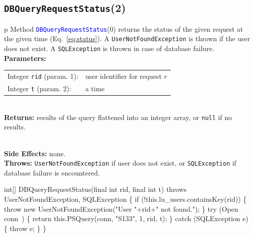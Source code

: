 \subsection{\texttt{DBQueryRequestStatus}(2)}
\begin{tabular}{p{\textwidth}}
\toprule
{}
Method \textcolor{blue}{{\tt{}\protect{}DBQueryRequestStatus}}(0) returns the status of
the given request at the given time (Eq.~\ref{eq:status}).
A {\tt{}UserNotFoundException} is thrown if the user does not exist.
A {\tt{}SQLException} is thrown in case of database failure.\\
\midrule
\textbf{Parameters:} \\
\begin{tabular}{lp{116mm}}
Integer {\tt{}rid} (param. 1):&user identifier for request $r$\\
Integer {\tt{}t} (param. 2):&a time
\end{tabular}\\
\textbf{Returns:} results of the query flattened into an integer array, or
{\tt{}null} if no results.

\\
\textbf{Side Effects:} none.\\
\textbf{Throws:} {\tt{}UserNotFoundException} if user does not exist, or
{\tt{}SQLException} if database failure is encountered.\\
\bottomrule
\end{tabular}
\nwenddocs{}\endmoddef{}
int[] DBQueryRequestStatus(final int rid, final int t)
throws UserNotFoundException, SQLException \{
  if (!this.lu_users.containsKey(rid)) \{
    throw new UserNotFoundException("User "+rid+" not found.");
  \}
  try (\LA{}Open \code{}conn\edoc{}~{\nwtagstyle{}}\RA{}) \{
    return this.PSQuery(conn, "S133", 1, rid, t);
  \} catch (SQLException e) \{
    throw e;
  \}
\}
\eatline
